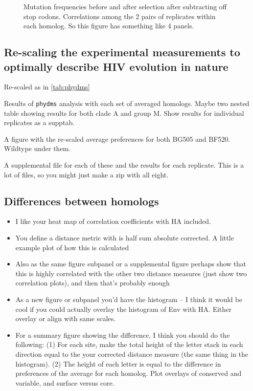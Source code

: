 \documentclass[9pt,lineno]{elife}
\begin{document}
\begin{figure}
\caption{\label{fig:mutfreqs}
Mutation frequencies before and after selection after subtracting off stop codons.
Correlations among the 2 pairs of replicates within each homolog.
So this figure has something like 4 panels.
}
\end{figure}

\subsection*{Re-scaling the experimental measurements to optimally describe HIV evolution in nature}

Re-scaled as in \ref{tab:phydms}

\begin{table}
\caption{\label{tab:phydms}
Results of \texttt{phydms} analysis with each set of averaged homologs.
Maybe two nested table showing results for both clade A and group M.
Show results for individual replicates as a supptab.
}
\end{table}

A figure with the re-scaled average preferences for both BG505 and BF520. Wildtype under them.

A supplemental file for each of these and the results for each replicate. This is a lot of files, so you might just make a zip with all eight.

\subsection*{Differences between homologs}

\begin{itemize}
\item I like your heat map of correlation coefficients with HA included.
\item You define a distance metric with is half sum absolute corrected. A little example plot of how this is calculated
\item Also as the same figure subpanel or a supplemental figure perhaps show that this is highly correlated with the other two distance measures (just show two correlation plots), and then that's probably enough
\item As a new figure or subpanel you'd have the histogram -- I think it would be cool if you could actually overlay the histogram of Env with HA. Either overlay or align with same scales. 
\item For a summary figure showing the difference, I think you should do the following: (1) For each site, make the total height of the letter stack in each direction equal to the your corrected distance measure (the same thing in the histogram). (2) The height of each letter is equal to the difference in preferences of the average for each homolog. Plot overlays of conserved and variable, and surface versus core.
\end{itemize}
\end{document}
